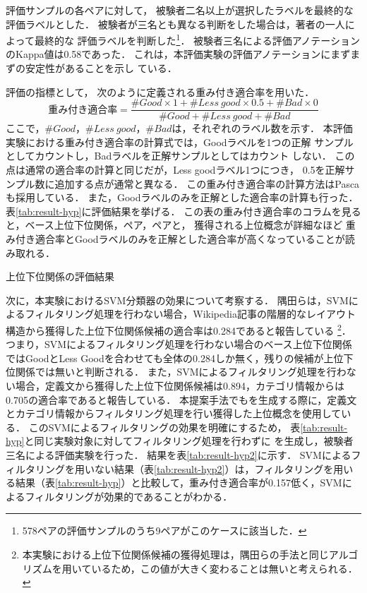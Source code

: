\documentclass[japanese]{jnlp_1.4}
\newcommand{\thype}{}
\newcommand{\ghype}{}
\begin{document}
評価サンプルの各ペアに対して，
被験者二名以上が選択したラベルを最終的な評価ラベルとした．
被験者が三名とも異なる判断をした場合は，著者の一人によって最終的な
評価ラベルを判断した\footnote{
578ペアの評価サンプルのうち9ペアがこのケースに該当した．
}．
被験者三名による評価アノテーションのKappa値は0.58であった．
これは，本評価実験の評価アノテーションにまずまずの安定性があることを示し
ている．

評価の指標として，
\pagebreak
次のように定義される重み付き適合率を用いた．
\begin{equation}
重み付き適合率=\frac{\#Good \times 1 + \#Less\ good \times 0.5 + \#Bad \times 0}{\#Good + \#Less\ good + \#Bad}
\label{formula:precision}
\end{equation}
ここで，$\#Good$，$\#Less\ good$，$\#Bad$は，それぞれのラベル数を示す．
本評価実験における重み付き適合率の計算式では，Goodラベルを1つの正解
サンプルとしてカウントし，Badラベルを正解サンプルとしてはカウント
しない．
この点は通常の適合率の計算と同じだが，Less goodラベル1つにつき，
0.5を正解サンプル数に追加する点が通常と異なる．
この重み付き適合率の計算方法はPasca \cite{pasca2007,pasca2009}も採用している．
また，Goodラベルのみを正解とした適合率の計算も行った．
表\ref{tab:result-hyp}に評価結果を挙げる．
この表の重み付き適合率のコラムを見ると，ベース上位下位関係，\ghype{}ペア，\thype{}ペアと，
獲得される上位概念が詳細なほど
重み付き適合率とGoodラベルのみを正解とした適合率が高くなっていることが読み取れる．

\begin{table}[t]
\caption{上位下位関係の評価結果}
\label{tab:result-hyp}

\end{table}


次に，本実験におけるSVM分類器の効果について考察する．
隅田らは，SVMによるフィルタリング処理を行わない場合，Wikipedia記事の階層的なレイアウト構造から獲得した上位下位関係候補の適合率は0.284であると報告している\cite{隅田:吉永:鳥澤:2009}
\footnote{本実験における上位下位関係候補の獲得処理は，隅田らの手法と同じアルゴリズムを用いているため，この値が大きく変わることは無いと考えられる．}．
つまり，SVMによるフィルタリング処理を行わない場合のベース上位下位関係ではGoodとLess Goodを合わせても全体の0.284しか無く，残りの候補が上位下位関係では無いと判断される．
また，SVMによるフィルタリング処理を行わない場合，定義文から獲得した上位下位関係候補は0.894，カテゴリ情報からは0.705の適合率であると報告している．
本提案手法でも\ghype{}を生成する際に，定義文とカテゴリ情報からフィルタリング処理を行い獲得した上位概念を使用している．
このSVMによるフィルタリングの効果を明確にするため，
表\ref{tab:result-hyp}と同じ実験対象に対してフィルタリング処理を行わずに
\ghype{}を生成し，被験者三名による評価実験を行った．
結果を表\ref{tab:result-hyp2}に示す．
SVMによるフィルタリングを用いない結果（表\ref{tab:result-hyp2}）は，フィルタリングを用いる結果（表\ref{tab:result-hyp}）と比較して，重み付き適合率が0.157低く，SVMによるフィルタリングが効果的であることがわかる．
\end{document}
